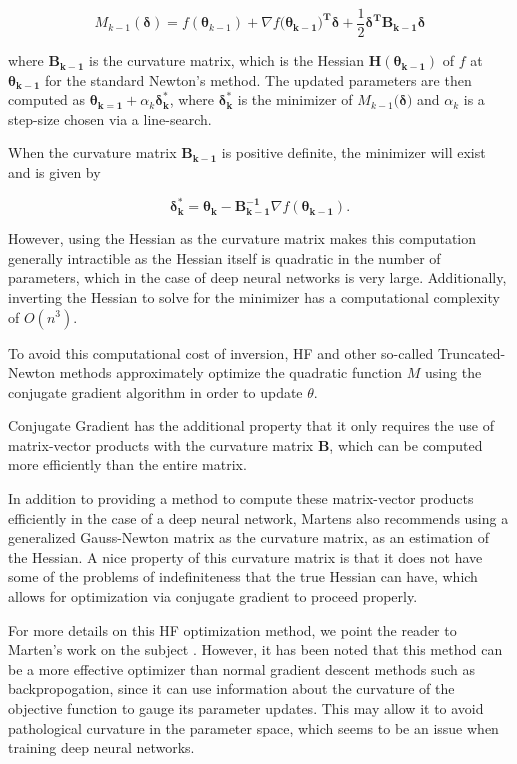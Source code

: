 \documentclass{article}
\begin{document}
\[
  M_{k-1}(\mathbf{\delta}) = f(\mathbf{\theta}_{k-1})
  + \nabla f(\mathbf{\theta_{k-1})^T \delta}
  + \frac{1}{2} \mathbf{\delta^T B_{k-1} \delta}
\]

where $\mathbf{B_{k-1}}$ is the curvature matrix, which is the Hessian
$\mathbf{H(\theta_{k-1})}$ of $f$ at $\mathbf{\theta_{k-1}}$ for the standard
Newton's method. The updated parameters are then computed as
$\mathbf{\theta_{k=1}} + \alpha_k \mathbf{\delta^{*}_{k}}$, where
$\mathbf{\delta^{*}_{k}}$ is the minimizer of $M_{k-1}(\mathbf{\delta)}$ and
$\alpha_k$ is a step-size chosen via a line-search.

When the curvature matrix $\mathbf{B_{k-1}}$ is positive definite, the minimizer will
exist and is given by

\[
  \mathbf{\delta^{*}_{k}} =
  \mathbf{\theta_k} - \mathbf{B^{-1}_{k-1}} \nabla f(\mathbf{\theta_{k-1}}).
\]

However, using the Hessian as the curvature matrix makes this computation
generally intractible as the Hessian itself is quadratic in the number
of parameters, which in the case of deep neural networks is very large.
Additionally, inverting the Hessian to solve for the minimizer has a computational
complexity of $O(n^3)$.

To avoid this computational cost of inversion, HF and other so-called
Truncated-Newton methods approximately optimize the quadratic function $M$
using the conjugate gradient algorithm in order to update $\theta$.

Conjugate Gradient has the additional property that it only requires the use
of matrix-vector products with the curvature matrix $\mathbf{B}$, which can
be computed more efficiently than the entire matrix.

In addition to providing a method to compute these matrix-vector products efficiently
in the case of a deep neural network, Martens also recommends using a generalized
Gauss-Newton matrix as the curvature matrix, as an estimation of the Hessian.
A nice property of this curvature matrix is that it does not have some of the
problems of indefiniteness that the true Hessian can have, which allows for 
optimization via conjugate gradient to proceed properly. 

For more details on this HF optimization method, we point the reader to
Marten's work on the subject \cite{martens2010deep}. However, it has been noted
that this method can be a more effective optimizer than normal gradient descent
methods such as backpropogation, since it can use information about the curvature
of the objective function to gauge its parameter updates. This may allow it
to avoid pathological curvature in the parameter space, which seems to be an
issue when training deep neural networks.
\end{document}
